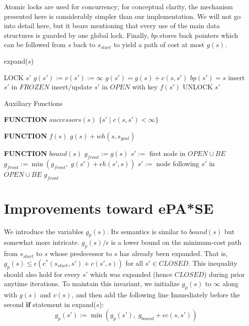 \documentclass[letterpaper]{article}
\begin{document}
Atomic locks are used for concurrency; for conceptual clarity, the mechanism presented here is considerably simpler than our implementation. We will not go into detail here, but it bears mentioning that every use of the main data structures is guarded by one global lock. Finally, $bp$ stores back pointers which can be followed from $s$ back to $s_{start}$ to yield a path of cost at most $g(s)$.

\begin{algorithm}
\caption{expand($s$)}
\label{alg:expand}
\begin{algorithmic}
\STATE LOCK $s'$
\STATE $g(s') := v(s') := \infty$
\ENDIF
{}
\STATE $g(s') = g(s) + c(s,s')$
\STATE $bp(s') = s$
\STATE insert $s'$ in $FROZEN$
\ELSE
\STATE insert/update $s'$ in $OPEN$ with key $f(s')$
\ENDIF
\ENDIF
\STATE UNLOCK $s'$
\ENDFOR
\end{algorithmic}
\end{algorithm}

\begin{algorithm}
\caption{Auxiliary Functions}
\label{alg:aux}
\begin{algorithmic}
\STATE \textbf{FUNCTION} $successors(s)$
\RETURN $\{s' \mid c(s,s')<\infty\}$

\STATE \textbf{FUNCTION} $f(s)$
\RETURN $g(s) + wh(s,s_{goal})$

\STATE \textbf{FUNCTION} $bound(s)$
\STATE $g_{front} := g(s)$
\STATE $s' :=$ first node in $OPEN \cup BE$
\STATE $g_{front} := \min(g_{front},\;g(s') + \epsilon h(s',s))$
\STATE $s' :=$ node following $s'$ in $OPEN \cup BE$
\ENDWHILE
\RETURN $g_{front}$
\end{algorithmic}
\end{algorithm}

\section{Improvements toward ePA*SE}

We introduce the variables $g_p(s)$. Its semantics is similar to $bound(s)$ but somewhat more intricate. $g_p(s)/\epsilon$ is a lower bound on the minimum-cost path from $s_{start}$ to $s$ whose predecessor to $s$ has already been expanded. That is, $g_p(s) \le \epsilon (c^*(s_{start},s') + c(s',s))$ for all $s'\in CLOSED$. This inequality should also hold for every $s'$ which was expanded (hence $CLOSED$) during prior anytime iterations. To maintain this invariant, we initialize $g_p(s)$ to $\infty$ along with $g(s)$ and $v(s)$, and then add the following line Immediately before the second \textbf{if} statement in expand($s$):
\[g_p(s') := \min(g_p(s'),\; g_{bound} + \epsilon c(s,s'))\]
\end{document}
